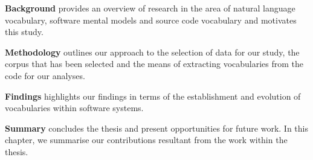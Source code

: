 \textbf{Background} provides an overview of research in the area of natural language vocabulary, software mental models and source code vocabulary and motivates this study.

\textbf{Methodology} outlines our approach to the selection of data for our study, the corpus that has been selected and the means of extracting vocabularies from the code for our analyses.

\textbf{Findings} highlights our findings in terms of the establishment and evolution of vocabularies within software systems.

\textbf{Summary} concludes the thesis and present opportunities for future work. In this chapter, we summarise our contributions resultant from the work within the thesis.

